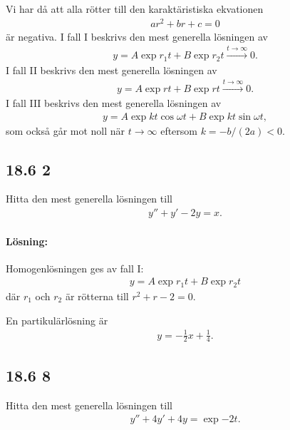 Vi har då att alla rötter till den karaktäristiska ekvationen
\begin{align*}
	a r^2 + b r + c = 0
\end{align*}
är negativa.
I fall I beskrivs den mest generella lösningen av
\begin{align*}
	y = A \exp{r_1 t} + B \exp{r_2 t} \overset{t \to \infty}{\longrightarrow} 0.
\end{align*}
I fall II beskrivs den mest generella lösningen av
\begin{align*}
	y = A \exp{r t} + B \exp{r t} \overset{t \to \infty}{\longrightarrow} 0.
\end{align*}
I fall III beskrivs den mest generella lösningen av
\begin{align*}
	y = A \exp{k t} \cos{\omega t} + B \exp{k t} \sin{\omega t},
\end{align*}
som också går mot noll när $t \to \infty$ eftersom $k = - b / (2 a) < 0$.


\subsection{18.6 2}%
\label{sub:18_6_2}

Hitta den mest generella lösningen till
\begin{align*}
	y'' + y' - 2 y = x.
\end{align*}

\paragraph{Lösning:}

Homogenlösningen ges av fall I:
\begin{align*}
	y = A \exp{r_1 t} + B \exp{r_2 t}
\end{align*}
där $r_1$ och $r_2$ är rötterna till $r^2 + r - 2 = 0$.

En partikulärlösning är
\begin{align}
	y = -\frac{1}{2} x + \frac{1}{4}.
\end{align}


\subsection{18.6 8}%
\label{sub:18_6_8}

Hitta den mest generella lösningen till
\begin{align*}
	y'' + 4 y' + 4 y = \exp{-2 t}.
\end{align*}

